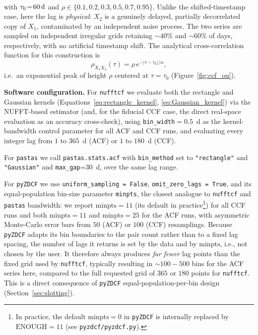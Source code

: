 \documentclass[twocolumn,10pt]{article}
\newcommand{\nufftcf}{\texttt{nufftcf}\xspace}
\newcommand{\pastas}{\texttt{pastas}\xspace}
\newcommand{\pyzdcf}{\texttt{pyZDCF}\xspace}
\begin{document}
\begin{itemize}
\begin{align}
		\label{eq:ou_coupling}
	\end{align}
	with $\tau_0\!=\!\text{60\,d}$ and $\rho\!\in\!\{0.1,0.2,0.3,0.5,0.7,0.95\}$. Unlike the shifted-timestamp case, here the lag is \emph{physical}: $X_2$ is a
	genuinely delayed, partially decorrelated copy of $X_1$, contaminated
	by an independent noise process. The two series are sampled on
	independent irregular grids retaining $\sim40\%$ and $\sim60\%$ of
	days, respectively, with no artificial timestamp shift. The
	analytical cross-correlation function for this construction is
	\begin{equation}
		\rho_{X_1X_2}(\tau) = \rho\, e^{-|\tau-\tau_0|/\alpha},
		\label{eq:ou_theory_ccf}
	\end{equation}
	i.e.\ an exponential peak of height $\rho$ centered at $\tau=\tau_0$
	(Figure~\ref{fig:ccf_ou}).
\end{itemize}

\textbf{Software configuration.} For \nufftcf we evaluate both the
rectangle  and  Gaussian kernels (Equations~\ref{eq:rectangle_kernel}, \ref{eq:Gaussian_kernel}) via the NUFFT-based estimator (and, for the
fiducial CCF case, the direct real-space evaluation as an accuracy
cross-check), using \texttt{bin\_width}$=0.5$~d as the kernel-bandwidth
control parameter for all ACF and CCF runs, and evaluating every
integer lag from $1$ to $365$~d (ACF) or $1$ to $180$~d (CCF). 

For \pastas we call \texttt{pastas.stats.acf} with \texttt{bin\_method} set to
\texttt{"rectangle"} and \texttt{"Gaussian"} and \texttt{max\_gap}=$30$~d,
over the same lag range. 

For \pyzdcf we use \texttt{uniform\_sampling = False}, \texttt{omit\_zero\_lags = True}, and its equal-population
bin-size parameter \texttt{minpts}, the closest analogue to \nufftcf
and \pastas bandwidth: we report $\mathrm{minpts}=11$ (its default in practice\footnote{In practice, the default $\mathrm{minpts}=0$ in \pyzdcf is internally replaced by $\mathrm{ENOUGH}=11$ (see \texttt{pyzdcf/pyzdcf.py}).}) for
all CCF runs and both $\mathrm{minpts}=11$ and $\mathrm{minpts}=25$ for
the ACF runs, with asymmetric Monte-Carlo error bars from $50$
(ACF) or $100$ (CCF) resamplings. Because \pyzdcf adapts its bin boundaries to the pair count rather than to a fixed lag spacing, the number of lags it returns is set by the data and by $\mathrm{minpts}$, i.e., not chosen by the user. It therefore always produces \emph{far fewer} lag points than the fixed grid used by \nufftcf, typically resulting in $\sim100-500$ bins for the ACF series here, compared to the full requested grid of $365$ or $180$ points for \nufftcf. This is a direct consequence of \pyzdcf equal-population-per-bin design (Section~\ref{sec:slotting}).
%
\end{document}
